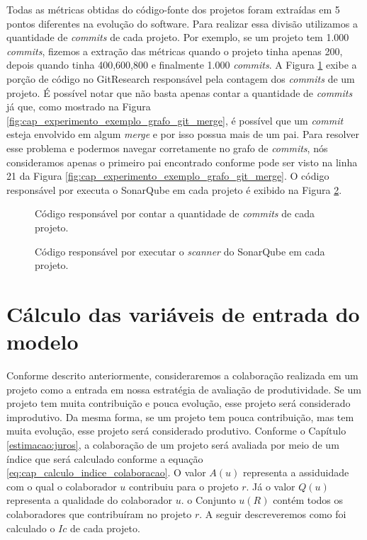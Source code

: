 
Todas as métricas obtidas do código-fonte dos projetos foram extraídas em 5 pontos diferentes na evolução do software.  Para realizar essa divisão utilizamos a quantidade de \textit{commits} de cada projeto. Por exemplo, se um projeto tem 1.000 \textit{commits}, fizemos a extração das métricas quando o projeto tinha apenas 200, depois quando tinha 400,600,800 e finalmente 1.000 \textit{commits}.  A Figura \ref{fig:codigo_conta_commits} exibe a porção de código no GitResearch responsável pela contagem dos \textit{commits} de um projeto. É possível notar que não basta apenas contar a quantidade de \textit{commits} já que, como mostrado na Figura \ref{fig:cap_experimento_exemplo_grafo_git_merge}, é possível que um \textit{commit} esteja envolvido em algum \textit{merge} e por isso possua mais de um pai. Para resolver esse problema e podermos navegar corretamente no grafo de \textit{commits}, nós consideramos apenas o primeiro pai encontrado conforme pode ser visto na linha 21 da Figura \ref{fig:cap_experimento_exemplo_grafo_git_merge}. O código responsável por executa o SonarQube em cada projeto é exibido na Figura \ref{fig:codigo_executa_sonar}.

 \begin{figure}[H]
  \centering
  \caption{Código responsável por contar a quantidade de \textit{commits} de cada projeto.}
  \label{fig:codigo_conta_commits} 
\end{figure}

 \begin{figure}[H]
  \centering
  \caption{Código responsável por executar o \textit{scanner} do SonarQube em cada projeto.}
  \label{fig:codigo_executa_sonar} 
\end{figure}
 


\section{Cálculo das variáveis de entrada do modelo}

Conforme descrito anteriormente, consideraremos a colaboração realizada em um projeto como a entrada em nossa estratégia de avaliação de produtividade. Se um projeto tem muita contribuição e pouca evolução, esse projeto será considerado improdutivo. Da mesma forma, se um projeto tem pouca contribuição, mas tem muita evolução, esse projeto será considerado produtivo. Conforme o Capítulo \ref{estimacao:juros}, a colaboração de um projeto será avaliada por meio de um índice que será calculado conforme a equação \ref{eq:cap_calculo_indice_colaboracao}. O valor $A(u)$ representa a assiduidade com o qual o colaborador $u$ contribuiu para o projeto $r$. Já o valor $Q(u)$ representa a qualidade do colaborador $u$. o Conjunto $u(R)$ contém todos os colaboradores que contribuíram no projeto $r$. A seguir descreveremos como foi calculado o $Ic$ de cada projeto.

